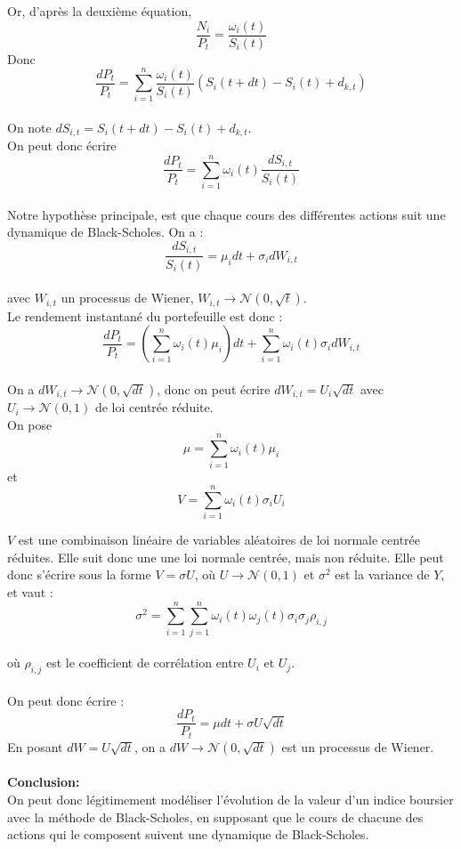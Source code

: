 \documentclass[french,12pt,a4paper]{article}
\begin{document}
Or, d'après la deuxième équation,
$$ \frac{N_i}{P_t} = \frac{\omega_i(t)}{S_i(t)} $$
Donc
$$ \frac{dP_t}{P_t} = \sum_{i=1}^n\frac{\omega_i(t)}{S_i(t)}(S_i(t+dt)-S_i(t) + d_{k,t}) $$
\\
On note $ dS_{i,t} = S_i(t+dt)-S_i(t)+d_{k,t} $. \\
On peut donc écrire
$$ \frac{dP_t}{P_t} = \sum_{i=1}^n\omega_i(t)\frac{dS_{i,t}}{S_i(t)} $$
\\
Notre hypothèse principale, est que chaque cours des différentes actions suit une dynamique de Black-Scholes. On a  :
$$ \frac{dS_{i,t}}{S_i(t)} = \mu_idt + \sigma_i dW_{i,t} $$  \\
avec $W_{i,t}$ un processus de Wiener, $ W_{i,t} \rightarrow \mathcal{N}(0,\sqrt{t})$.\\

Le rendement instantané du portefeuille est donc :
$$ \frac{dP_t}{P_t} = (\sum_{i=1}^n\omega_i(t)\mu_i)dt + \sum_{i=1}^n\omega_i(t)\sigma_idW_{i,t} $$ \\
On a $ dW_{i,t} \rightarrow \mathcal{N}(0,\sqrt{dt})$, donc on peut écrire $dW_{i,t} = U_i\sqrt{dt}$ avec $U_i \rightarrow \mathcal{N}(0,1)$ de loi centrée réduite. \\
On pose
$$\mu = \sum_{i=1}^n\omega_i(t)\mu_i$$ et $$V = \sum_{i=1}^n\omega_i(t)\sigma_iU_i$$

$V$ est une combinaison linéaire de variables aléatoires de loi normale centrée réduites. Elle suit donc une une loi normale centrée, mais non réduite. Elle peut donc s'écrire sous la forme $V = \sigma U$, où $U \rightarrow \mathcal{N}(0,1)$ et $\sigma^2$ est la variance de $Y$, et vaut :
$$\sigma^2 = \sum_{i=1}^n\sum_{j=1}^n\omega_i(t)\omega_j(t)\sigma_i\sigma_j\rho_{i,j} $$ \\
où $\rho_{i,j}$ est le coefficient de corrélation entre $U_i$ et $U_j$. \\\\
On peut donc écrire :
$$ \frac{dP_t}{P_t} = \mu dt + \sigma U \sqrt{dt} $$
En posant $dW = U \sqrt{dt}$, on a $dW \rightarrow \mathcal{N}(0,\sqrt{dt})$ est un processus de Wiener. \\ \\
\textbf{Conclusion:}\\
On peut donc légitimement modéliser l'évolution de la valeur d'un indice boursier avec la méthode de Black-Scholes, en supposant que le cours de chacune des actions qui le composent suivent une dynamique de Black-Scholes.
\end{document}
